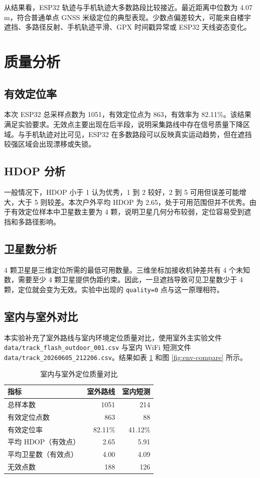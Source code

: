 \documentclass[UTF8,a4paper,12pt]{ctexart}
\begin{document}
从结果看，ESP32 轨迹与手机轨迹大多数路段比较接近。最近距离中位数为 4.07 m，符合普通单点 GNSS 米级定位的典型表现。少数点偏差较大，可能来自楼宇遮挡、多路径反射、手机轨迹平滑、GPX 时间戳异常或 ESP32 天线姿态变化。

\clearpage
\section{质量分析}
\subsection{有效定位率}
本次 ESP32 总采样点数为 1051，有效定位点为 863，有效率为 82.11\%。该结果满足实验要求。无效点主要出现在后半段，说明采集路线中存在信号质量下降区域。与手机轨迹对比可见，ESP32 在多数路段可以反映真实运动趋势，但在遮挡较强区域会出现漂移或失锁。

\subsection{HDOP 分析}
一般情况下，HDOP 小于 1 认为优秀，1 到 2 较好，2 到 5 可用但误差可能增大，大于 5 则较差。本次户外平均 HDOP 为 2.65，处于可用范围但并不优秀。由于有效定位样本中卫星数主要为 4 颗，说明卫星几何分布较弱，定位容易受到遮挡和多路径影响。

\subsection{卫星数分析}
4 颗卫星是三维定位所需的最低可用数量。三维坐标加接收机钟差共有 4 个未知数，需要至少 4 颗卫星提供伪距约束。因此，一旦遮挡导致可见卫星数少于 4 颗，定位就会变为无效。实验中出现的 \verb|quality=0| 点与这一原理相符。

\subsection{室内与室外对比}
本实验补充了室外路线与室内环境定位质量对比，使用室外主实验文件 \verb|data/track_flash_outdoor_001.csv| 与室内 WiFi 短测文件 \verb|data/track_20260605_212206.csv|。结果如表 \ref{tab:env-compare} 和图 \ref{fig:env-compare} 所示。

\begin{table}[H]
\centering
\caption{室内与室外定位质量对比}
\label{tab:env-compare}
\begin{tabular}{lrr}
\toprule
指标 & 室外路线 & 室内短测 \\
\midrule
总样本数 & 1051 & 214 \\
有效定位点数 & 863 & 88 \\
有效定位率 & 82.11\% & 41.12\% \\
平均 HDOP（有效点） & 2.65 & 5.91 \\
平均卫星数（有效点） & 4.00 & 4.09 \\
无效点数 & 188 & 126 \\
\bottomrule
\end{tabular}
\end{table}
\end{document}
